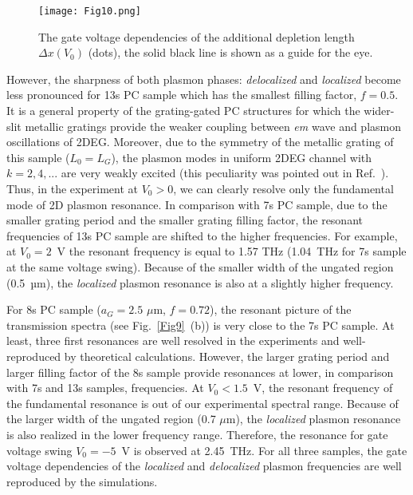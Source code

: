 \documentclass[%
 reprint,
 amsmath,amssymb,
 aps,
]{revtex4-2}
\begin{document}
\begin{figure}[b!!!]
\texttt{[image: Fig10.png]}
\caption{
The gate voltage dependencies of the additional depletion length $\Delta x(V_0)$ (dots), the solid black line is shown as a guide for the eye.}
\label{Fig10}
\end{figure}

However, the sharpness of both plasmon phases: \textit{ delocalized} and \textit{ localized} become less pronounced for 13s PC sample which has the smallest filling factor, $f = 0.5$. It is a general property of the grating-gated PC structures for which the wider-slit metallic gratings provide the weaker coupling between \textit{em} wave and plasmon oscillations of 2DEG. 
Moreover, due to the symmetry of the metallic grating of this sample ($L_0 = L_G$), the plasmon modes in uniform 2DEG channel with $k = 2, 4, ...$ are very weakly excited (this peculiarity was pointed out in Ref.~\cite{Michailov1998, KorRCWA2021}). 
Thus, in the experiment at $V_0 > 0$, we can clearly resolve only the fundamental mode of 2D plasmon resonance.
In comparison with 7s PC sample, due to the smaller grating period and the smaller grating filling factor, the resonant frequencies of 13s PC sample are shifted to the higher frequencies. For example, at $V_0 = 2$~V the resonant frequency is equal to 1.57 THz (1.04~THz for 7s sample at the same voltage swing). Because of the smaller width of the ungated region (0.5~µm), the \textit{ localized} plasmon resonance is also at a slightly higher frequency.

For 8s PC sample ($a_G = 2.5$ $\mu$m, $f = 0.72$), the resonant picture of the transmission spectra (see Fig.~\ref{Fig9}~(b)) is very close to the 7s PC sample. At least, three first resonances are well resolved in the experiments and well-reproduced by theoretical calculations. 
However, the larger grating period and larger filling factor of the 8s sample provide resonances at lower, in comparison with 7s and 13s samples, frequencies.
At $V_0 < 1.5$~V, the resonant frequency of the fundamental resonance is out of our experimental spectral range. Because of the larger width of the ungated region (0.7 $\mu$m), the \textit{ localized} plasmon resonance is also realized in the lower frequency range. Therefore, the resonance for gate voltage swing $V_0 = -5$~V is observed at 2.45~THz.
For all three samples, the gate voltage dependencies of the \textit{localized} and \textit{delocalized} plasmon frequencies are well reproduced by the simulations.
\end{document}
